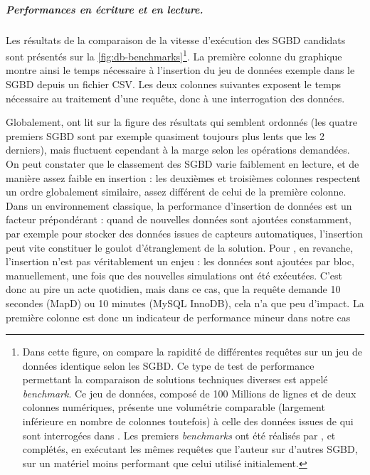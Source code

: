 \subparagraph{Performances en écriture et en lecture.}

Les résultats de la comparaison de la vitesse d'exécution des SGBD candidats sont présentés sur la \cref{fig:db-benchmarks}\footnote{
	Dans cette figure, on compare la rapidité de différentes requêtes sur un jeu de données identique selon les SGBD.
	Ce type de test de performance permettant la comparaison de solutions techniques diverses est appelé \textit{benchmark}.
	Ce jeu de données, composé de 100 Millions de lignes et de deux colonnes numériques, présente une volumétrie comparable (largement inférieure en nombre de colonnes toutefois) à celle des données issues de \simfeodal{} qui sont interrogées dans \simedb{}.
	Les premiers \textit{benchmarks} ont été réalisés par \textcite{pafka_benchm-databases_2017}, et complétés, en exécutant les mêmes requêtes que l'auteur sur d'autres SGBD, sur un matériel moins performant que celui utilisé initialement.
}.
La première colonne du graphique montre ainsi le temps nécessaire à l'insertion du jeu de données exemple dans le SGBD depuis un fichier CSV.
Les deux colonnes suivantes exposent le temps nécessaire au traitement d'une requête, donc à une interrogation des données.

Globalement, ont lit sur la figure des résultats qui semblent ordonnés (les quatre premiers SGBD sont par exemple quasiment toujours plus lents que les 2 derniers), mais fluctuent cependant à la marge selon les opérations demandées.
On peut constater que le classement des SGBD varie faiblement en lecture, et de manière assez faible en insertion : les deuxièmes et troisièmes colonnes respectent un ordre globalement similaire, assez différent de celui de la première colonne.
Dans un environnement classique, la performance d'insertion de données est un facteur prépondérant : quand de nouvelles données sont ajoutées constamment, par exemple pour stocker des données issues de capteurs automatiques, l'insertion peut vite constituer le goulot d'étranglement de la solution.
Pour \simfeodal{}, en revanche, l'insertion n'est pas véritablement un enjeu : les données sont ajoutées par bloc, manuellement, une fois que des nouvelles simulations ont été exécutées.
C'est donc au pire un acte quotidien, mais dans ce cas, que la requête demande 10 secondes (MapD) ou 10 minutes (MySQL InnoDB), cela n'a que peu d'impact.
La première colonne est donc un indicateur de performance mineur dans notre cas

